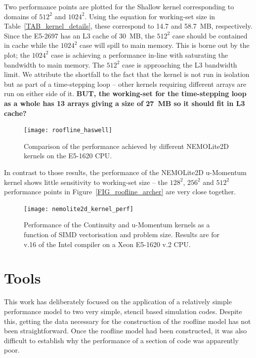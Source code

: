 \documentclass[12pt]{article}
\begin{document}
 Two performance points are plotted for the Shallow kernel
 corresponding to domains of $512^2$ and $1024^2$. Using the equation
 for working-set size in Table~\ref{TAB_kernel_details}, these
 correspond to 14.7 and 58.7~MB, respectively. Since the E5-2697 has
 an L3 cache of 30~MB, the $512^2$ case should be contained in cache
 while the $1024^2$ case will spill to main memory. This is borne out
 by the plot; the $1024^2$ case is achieving a performance in-line
 with saturating the bandwidth to main memory. The $512^2$ case is
 approaching the L3 bandwidth limit. We attribute the shortfall to the
 fact that the kernel is not run in isolation but as part of a
 time-stepping loop -- other kernels requiring different arrays are
 run on either side of it. {\bf BUT, the working-set for the
   time-stepping loop as a whole has 13 arrays giving a size of 27~MB
   so it should fit in L3 cache?}

\begin{figure}
\centering
\texttt{[image: roofline\_haswell]}
\caption{Comparison of the performance achieved by different
  NEMOLite2D kernels on the E5-1620 CPU.}
\label{FIG_roofline_haswell}
\end{figure}

In contrast to those results, the performance of the NEMOLite2D
u-Momentum kernel shows little sensitivity to working-set size -- the
$128^2$, $256^2$ and $512^2$ performance points in
Figure~\ref{FIG_roofline_archer} are very close together.

\begin{figure}
  \centering
  \texttt{[image: nemolite2d\_kernel\_perf]}
  \caption{Performance of the Continuity and u-Momentum kernels as a
    function of SIMD vectorisation and problem size. Results are for
    v.16 of the Intel compiler on a Xeon E5-1620 v.2 CPU.}
  \label{FIG_kernel_perf}
\end{figure}

\section{Tools}

This work has deliberately focused on the application of a relatively
simple performance model to two very simple, stencil based simulation
codes.  Despite this, getting the data necessary for the construction
of the roofline model has not been straightforward. Once the roofline
model had been constructed, it was also difficult to establish why the
performance of a section of code was apparently poor.
\end{document}
